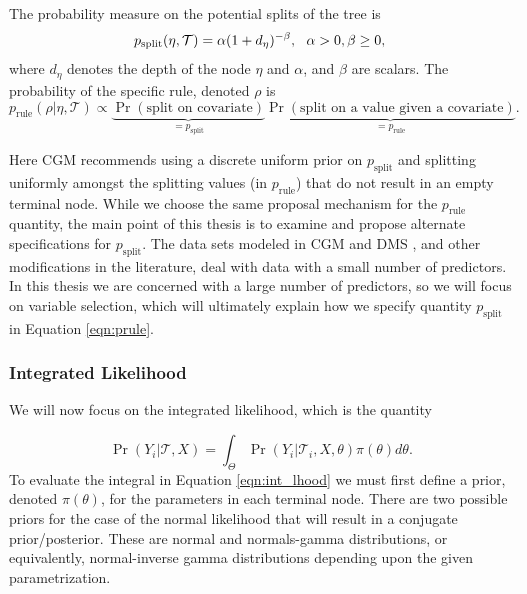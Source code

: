 The probability measure on the potential splits of the tree is
\begin{equation}\label{eqn:psplit}
p_{\text{split}}(\eta, \mathcal{T})=\alpha(1+d_{\eta})^{-\beta}, \ \ \alpha>0, \beta\geq 0,\\
\end{equation}
where $d_{\eta}$ denotes the depth of the node $\eta$ and $\alpha$, and $\beta$ are scalars. The probability of the specific rule, denoted $\rho$ is 
\begin{equation}\label{eqn:prule}
p_{\text{rule}}(\rho \vert \eta, \mathcal{T}) \propto \underbrace{\Pr(\text{split on covariate})}_{=p_{\text{split}}}\underbrace{\Pr(\text{split on a value given a covariate})}_{=p_{\text{rule}}}. 
\end{equation}

Here CGM recommends using a discrete uniform prior on $p_{\text{split}}$ and splitting uniformly amongst the splitting values (in $p_{\text{rule}}$) that do not result in an empty terminal node. While we choose the same proposal mechanism for the $p_{\text{rule}}$ quantity, the main point of this thesis is to examine and propose alternate specifications for $p_{\text{split}}$. The data sets modeled in CGM \cite{chipman1998bayesian} and DMS \cite{denison1998bayesian}, and other modifications in the literature, deal with data with a small number of predictors. In this thesis we are concerned with a large number of predictors, so we will focus on variable selection, which will ultimately explain how we specify quantity $p_{\text{split}}$ in Equation \ref{eqn:prule}. 

\subsubsection{Integrated Likelihood}
We will now focus on the integrated likelihood, which is the quantity 

\begin{equation}\label{eqn:int_lhood}
\Pr(Y_i \vert \mathcal{T}, X) = \int_{\Theta}\Pr(Y_i \vert \mathcal{T}_i, X, \theta)\pi(\theta)d\theta.
\end{equation}
To evaluate the integral in Equation \ref{eqn:int_lhood} we must first define a prior, denoted $\pi(\theta)$, for the parameters in each terminal node. 
There are two possible priors for the case of the normal likelihood that will result in a conjugate prior/posterior. These are normal and normals-gamma distributions, or equivalently, normal-inverse gamma distributions depending upon the given parametrization. 

